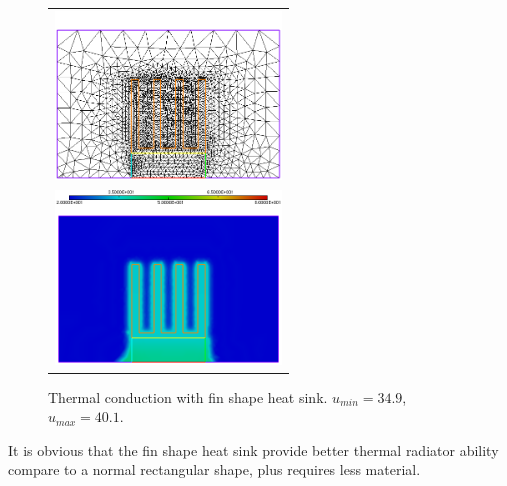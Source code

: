 \begin{figure}[http]
	\centering
	\begin{tabular}{c}
		\includegraphics[width=6cm]{figures/finsinkc} \\ \includegraphics[width=6cm]{figures/finsinkb}
	\end{tabular}
	\caption{Thermal conduction with fin shape heat sink. $u_{min}=34.9$, $u_{max}=40.1$.}
\end{figure}
It is obvious that the fin shape heat sink provide better thermal radiator ability compare to a normal rectangular shape, plus requires less material.
